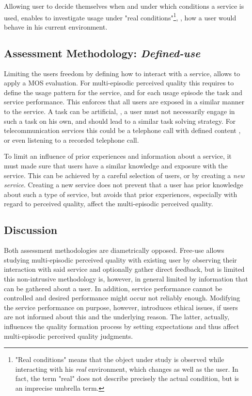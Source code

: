 Allowing user to decide themselves when and under which conditions a service is used, enables to investigate usage under "real conditions"\footnote{"Real conditions" means that the object under study is observed while interacting with his \emph{real} environment, which changes as well as the user. In fact, the term "real" does not describe precisely the actual condition, but is an imprecise umbrella term.}, \ie, how a user would behave in his current environment.

\subsection{Assessment Methodology: \emph{Defined-use}}\label{method:definedUse}
Limiting the users freedom by defining how to interact with a service, allows to apply a \ac{MOS} evaluation.
For multi-episodic perceived quality this requires to define the usage pattern for the service, and for each usage episode the task and service performance.
This enforces that all users are exposed in a similar manner to the service.
A task can be artificial, \ie, a user must not necessarily engage in such a task on his own, and should lead to a similar task solving strategy.
For telecommunication services this could be a telephone call with defined content \citep[\cf][]{itu-t_p.805:_2007}, or even listening to a recorded telephone call.

To limit an influence of prior experiences and information about a service, it must made sure that users have a similar knowledge and exposure with the service.
This can be achieved by a careful selection of users, or by creating a \emph{new service}.
Creating a new service does not prevent that a user has prior knowledge about such a type of service, but avoids that prior experiences, especially with regard to perceived quality, affect the multi-episodic perceived quality.

\subsection{Discussion}
Both assessment methodologies are diametrically opposed. 
Free-use allows studying multi-episodic perceived quality with existing user by observing their interaction with said service and optionally gather direct feedback, but is limited this non-intrusive methodology is, however, in general limited by information that can be gathered about a user.
In addition, service performance cannot be controlled and desired performance might occur not reliably enough.
Modifying the service performance on purpose, however, introduces ethical issues, if users are not informed about this and the underlying reason.
The latter, actually, influences the quality formation process by setting expectations and thus affect multi-episodic perceived quality judgments.

